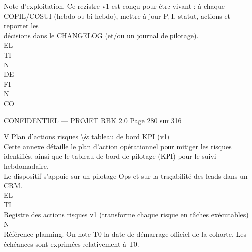 \documentclass[12pt,landscape,a4paper]{article}
\newenvironment{confidential}
{\begin{tcolorbox}[
    colback=rbkred!5!white,
    colframe=rbkred!75!black,
    title=CONFIDENTIEL,
    fonttitle=\bfseries\color{white},
    coltitle=rbkred!75!black,
    breakable,
    enhanced,
    frame hidden,
    borderline west={2pt}{0pt}{rbkred!75!black}
]}
{\end{tcolorbox}}
\begin{document}
\vspace{0.5em}
Note d’exploitation.      Ce registre v1 est conçu pour être vivant : à chaque COPIL/COSUI (hebdo ou bi-hebdo), mettre à jour P, I, statut, actions et reporter les\\
décisions dans le CHANGELOG (et/ou un journal de pilotage).\\
\vspace{0.5em}
\vspace{0.5em}
\vspace{0.5em}
\vspace{0.5em}
EL\\
TI\\
N\\
DE\\
FI\\
N\\
CO\\
\vspace{0.5em}
\vspace{0.5em}
\vspace{0.5em}
\vspace{0.5em}
\begin{confidential}CONFIDENTIEL — PROJET RBK 2.0                                         Page 280 sur 316\end{confidential}
V \textbar{} Plan d’actions risques \textbackslash{}& tableau de bord KPI (v1)\\
\vspace{0.5em}
\vspace{0.5em}
Cette annexe détaille le plan d’action opérationnel pour mitiger les risques identifiés, ainsi que le tableau de bord de pilotage (KPI) pour le suivi hebdomadaire.\\
Le dispositif s’appuie sur un pilotage Ops et sur la traçabilité des leads dans un CRM.\\
\vspace{0.5em}
\vspace{0.5em}
\vspace{0.5em}
\vspace{0.5em}
EL\\
TI\\
Registre des actions risques v1 (transforme chaque risque en tâches exécutables)\\
\vspace{0.5em}
\vspace{0.5em}
\vspace{0.5em}
\vspace{0.5em}
N\\
Référence planning.          On note T0 la date de démarrage officiel de la cohorte. Les échéances sont exprimées relativement à T0.\\
\end{document}
